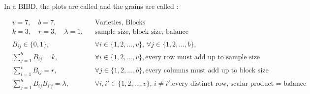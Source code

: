 \documentclass{cons-beamer}
\newcommand{\Variety}{grain}           \newcommand{\Block}{\textnormal{plot}}
\begin{document}
\begin{frame}
  In a BIBD, the plots are called  and the \Variety s are called :

  \begin{example}
    \footnotesize
    \vspace{-1em}
    \begin{align*}
      &v = 7, \quad b = 7, &&\mbox{Varieties, Blocks}\\
      &k = 3, \quad r = 3, \quad \lambda = 1, &&\mbox{sample size, block size, balance}\\
      \\
      &B_{ij} \in \{0, 1\}, \quad &&\forall i \in \{1, 2, \dots, v\}, \, \forall j \in \{1, 2, \dots, b\}, \\
      &\sum_{j=1}^b B_{ij} = k, \quad &&\forall i \in \{1, 2, \dots, v\}, \mbox{every row must add up to sample size}\\
      &\sum_{i=1}^v B_{ij} = r, \quad &&\forall j \in \{1, 2, \dots, b\}, \mbox{every columns must add up to block size}\\
      &\sum_{j=1}^b B_{ij} B_{i'j} = \lambda, \quad &&\forall i, i' \in \{1, 2, \dots, v\}, \, i \neq i'. \mbox{every distinct row, scalar product = balance}
    \end{align*}
  \end{example}  
\end{frame}
\end{document}
